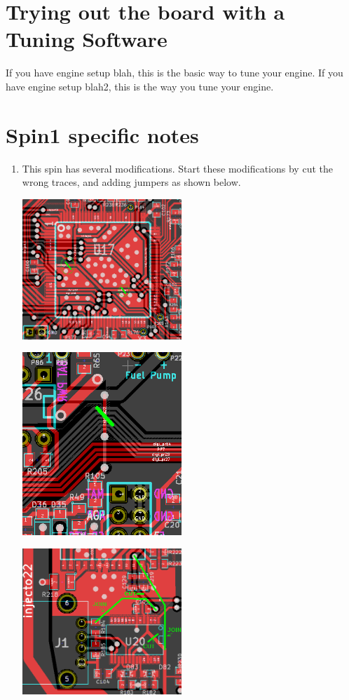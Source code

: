 \documentclass[12pt,a4paper,titlepage]{article}
\begin{document}
\section{Trying out the board with a Tuning Software}

If you have engine setup blah, this is the basic way to tune your engine.
If you have engine setup blah2, this is the way you tune your engine.

\section{Spin1 specific notes}

\begin{enumerate}
\item This spin has several modifications. Start these modifications by cut the wrong traces, and adding jumpers as shown below.

\includegraphics[width = 6cm]{images/MCU_VDD_traces.png}

\includegraphics[width = 6cm]{images/BRV_hack.png}

\includegraphics[width = 6cm]{images/USB_power_hack.png}


\end{enumerate}
\end{document}
